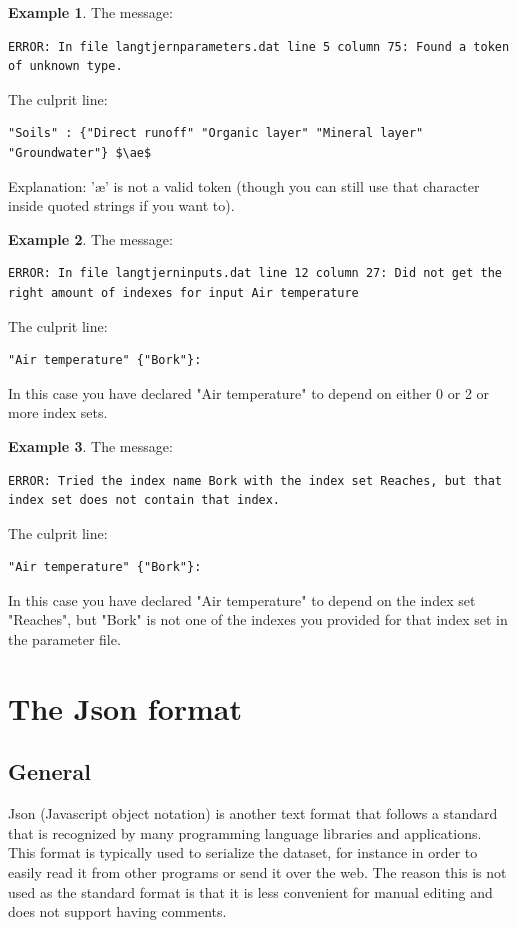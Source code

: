 \documentclass[11pt]{article}
\theoremstyle{definition}
\newtheorem{myexample}{Example}
\newenvironment{example}%
  {\begin{lrbox}{\examplebox}%
   \begin{minipage}{\dimexpr\linewidth-2\fboxsep}
   \begin{myexample}}%
  {\end{myexample}%
   \end{minipage}%
   \end{lrbox}%
   \begin{trivlist}
     \item[]\colorbox{silver}{\usebox\examplebox}
   \end{trivlist}}
\begin{document}
\begin{example}
The message:
\begin{lstlisting}
ERROR: In file langtjernparameters.dat line 5 column 75: Found a token of unknown type.
\end{lstlisting}
The culprit line:
\begin{lstlisting}[mathescape]
"Soils" : {"Direct runoff" "Organic layer" "Mineral layer" "Groundwater"} $\ae$
\end{lstlisting}
Explanation: '\ae' is not a valid token (though you can still use that character inside quoted strings if you want to).
\end{example}

\begin{example}
The message:
\begin{lstlisting}
ERROR: In file langtjerninputs.dat line 12 column 27: Did not get the right amount of indexes for input Air temperature
\end{lstlisting}
The culprit line:
\begin{lstlisting}[mathescape]
"Air temperature" {"Bork"}:
\end{lstlisting}
In this case you have declared "Air temperature" to depend on either 0 or 2 or more index sets.
\end{example}

\begin{example}
The message:
\begin{lstlisting}
ERROR: Tried the index name Bork with the index set Reaches, but that index set does not contain that index.
\end{lstlisting}
The culprit line:
\begin{lstlisting}[mathescape]
"Air temperature" {"Bork"}:
\end{lstlisting}
In this case you have declared "Air temperature" to depend on the index set "Reaches", but "Bork" is not one of the indexes you provided for that index set in the parameter file.
\end{example}

\section{The Json format}

\subsection{General}

Json (Javascript object notation)  is another text format that follows a standard that is recognized by many programming language libraries and applications. This format is typically used to serialize the dataset, for instance in order to easily read it from other programs or send it over the web. The reason this is not used as the standard format is that it is less convenient for manual editing and does not support having comments.
\end{document}
